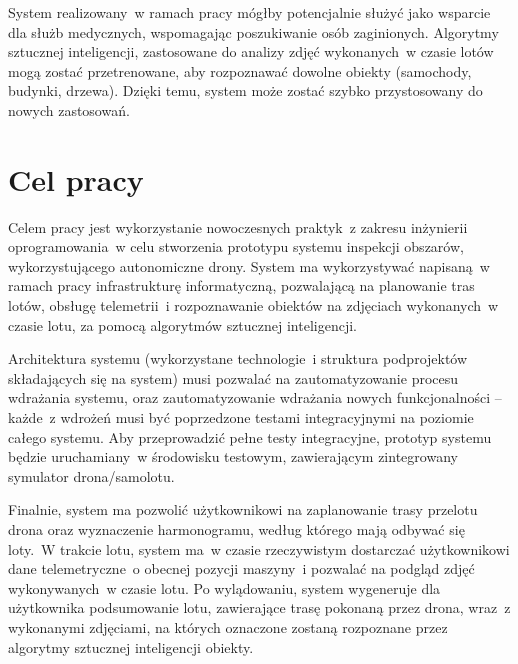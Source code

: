System realizowany~w ramach pracy mógłby potencjalnie służyć jako wsparcie dla służb
medycznych, wspomagając poszukiwanie osób zaginionych. Algorytmy sztucznej inteligencji,
zastosowane do analizy zdjęć wykonanych~w czasie lotów mogą zostać przetrenowane, aby 
rozpoznawać dowolne obiekty (samochody, budynki, drzewa). Dzięki temu, system może zostać
szybko przystosowany do nowych zastosowań.
  


\newpage
\section{Cel pracy} \label{intro_objective}

Celem pracy jest wykorzystanie nowoczesnych praktyk~z zakresu inżynierii 
oprogramowania~w celu stworzenia prototypu systemu inspekcji obszarów,
wykorzystującego autonomiczne drony. System ma wykorzystywać napisaną~w ramach pracy
infrastrukturę informatyczną, pozwalającą na planowanie tras lotów, obsługę telemetrii~i
rozpoznawanie obiektów na zdjęciach wykonanych~w czasie lotu, za pomocą algorytmów
sztucznej inteligencji. 

Architektura systemu (wykorzystane technologie~i struktura podprojektów składających
się na system) musi pozwalać na zautomatyzowanie procesu wdrażania
systemu, oraz zautomatyzowanie wdrażania nowych funkcjonalności -- każde~z wdrożeń musi
być poprzedzone testami integracyjnymi na poziomie całego systemu.
Aby przeprowadzić pełne testy integracyjne, prototyp systemu będzie uruchamiany~w
środowisku testowym, zawierającym zintegrowany symulator drona/samolotu.

Finalnie, system ma pozwolić użytkownikowi na zaplanowanie trasy przelotu drona
oraz wyznaczenie harmonogramu, według którego mają odbywać się loty.~W trakcie 
lotu, system ma~w czasie rzeczywistym dostarczać użytkownikowi dane telemetryczne~o
obecnej pozycji maszyny~i pozwalać na podgląd zdjęć wykonywanych~w czasie lotu.
Po wylądowaniu, system wygeneruje dla użytkownika podsumowanie lotu, zawierające
trasę pokonaną przez drona, wraz~z wykonanymi zdjęciami, na których oznaczone zostaną
rozpoznane przez algorytmy sztucznej inteligencji obiekty.

